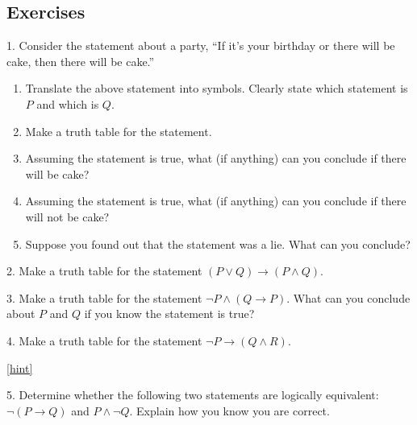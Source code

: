\documentclass[10pt,]{book}
\theoremstyle{plain}
\theoremstyle{definition}
\theoremstyle{definition}
\theoremstyle{definition}
\numberwithin{equation}{chapter}
\def\imp{\rightarrow}
\begin{document}
\subsection*{Exercises}\label{exercises_sec-logic}
\begin{exerciselist}
\item[1.]\hypertarget{exercise-99}{}\hypertarget{p-2348}{}%
Consider the statement about a party, ``If it's your birthday or there will be cake, then there will be cake.''%
\par
\hypertarget{p-2349}{}%
\leavevmode%
\begin{enumerate}[label=(\alph*)]
\item\hypertarget{li-476}{}\hypertarget{p-2350}{}%
Translate the above statement into symbols. Clearly state which statement is \(P\) and which is \(Q\).%
\item\hypertarget{li-477}{}\hypertarget{p-2351}{}%
Make a truth table for the statement.%
\item\hypertarget{li-478}{}\hypertarget{p-2352}{}%
Assuming the statement is true, what (if anything) can you conclude if there will be cake?%
\item\hypertarget{li-479}{}\hypertarget{p-2353}{}%
Assuming the statement is true, what (if anything) can you conclude if there will not be cake?%
\item\hypertarget{li-480}{}\hypertarget{p-2354}{}%
Suppose you found out that the statement was a lie. What can you conclude?%
\end{enumerate}
%
\par\smallskip
\item[2.]\hypertarget{exercise-100}{}\hypertarget{p-2360}{}%
Make a truth table for the statement \((P \vee Q) \imp (P \wedge Q)\).%
\par\smallskip
\item[3.]\hypertarget{exercise-101}{}\hypertarget{p-2361}{}%
Make a truth table for the statement \(\neg P \wedge (Q \imp P)\). What can you conclude about \(P\) and \(Q\) if you know the statement is true?%
\par\smallskip
\item[4.]\hypertarget{exercise-102}{}\hypertarget{p-2363}{}%
Make a truth table for the statement \(\neg P \imp (Q \wedge R)\).%
\par\smallskip
\hfill{\tiny\hyperlink{a-B.4.4}{[hint]}\hypertarget{q-B.4.4}{}}\item[5.]\hypertarget{exercise-103}{}\hypertarget{p-2365}{}%
Determine whether the following two statements are logically equivalent:  \(\neg(P \imp Q)\) and \(P \wedge \neg Q\). Explain how you know you are correct.%

\end{exerciselist}
\end{document}
